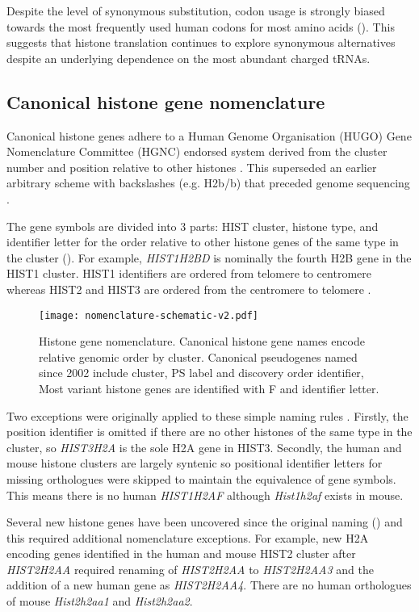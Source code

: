 	Despite the level of synonymous substitution, 
	codon usage is strongly biased towards 
	the most frequently used human codons for most amino acids (). 
	This suggests that histone translation continues to explore synonymous alternatives 
	despite an underlying dependence on the most abundant charged tRNAs.

\subsection{Canonical histone gene nomenclature}
	Canonical histone genes adhere to a Human Genome Organisation (HUGO) Gene Nomenclature Committee (HGNC) 
	endorsed system derived from the cluster number and position relative to other histones \citep{Marzluff02}. 
	This superseded an earlier arbitrary scheme with backslashes (e.g. H2b/b) 
	that preceded genome sequencing \citep{AlbigGenomics1997,AlbigHumangen1997}.

	The gene symbols are divided into 3 parts: 
	HIST cluster, histone type, and identifier letter
	for the order relative to other histone genes of the same type in the cluster ().
	For example, \textit{HIST1H2BD} is nominally the fourth H2B gene in the HIST1 cluster.
	HIST1 identifiers are ordered from telomere to centromere 
	whereas HIST2 and HIST3 are ordered from the centromere to telomere \citep{Marzluff02}.

\begin{figure*}
	\centering
	\texttt{[image: nomenclature-schematic-v2.pdf]}
	\caption{Histone gene nomenclature. 
	Canonical histone gene names encode relative genomic order by cluster.
	Canonical pseudogenes named since 2002 include cluster, PS label and discovery order identifier,
	Most variant histone genes are identified with F and identifier letter.}
	\label{fig:nomenclature}
\end{figure*}

	Two exceptions were originally applied to these simple naming rules \citep{Marzluff02}. 
	Firstly, the position identifier is omitted if there are no other histones of the same type in the cluster, 
	so \textit{HIST3H2A} is the sole H2A gene in HIST3. 
	Secondly, the human and mouse histone clusters are largely syntenic 
	so positional identifier letters for missing orthologues were skipped to maintain the equivalence of gene symbols.
	This means there is no human \textit{HIST1H2AF} although \textit{Hist1h2af} exists in mouse.

	Several new histone genes have been uncovered since the original naming () 
	and this required additional nomenclature exceptions.
	For example, new H2A encoding genes identified in the human and mouse HIST2 cluster after \textit{HIST2H2AA} 
	required renaming of \textit{HIST2H2AA} to \textit{HIST2H2AA3} 
	and the addition of a new human gene as \textit{HIST2H2AA4}. 
	There are no human orthologues of mouse \textit{Hist2h2aa1} and \textit{Hist2h2aa2}.

